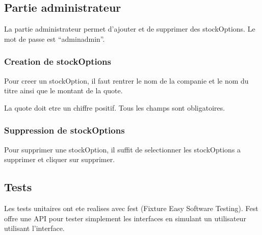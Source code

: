 \subsection{Partie administrateur}
La partie administrateur permet d'ajouter et de supprimer des stockOptions. Le mot de passe est ``adminadmin''.
\subsubsection{Creation de stockOptions}
Pour creer un stockOption, il faut rentrer le nom de la companie et le nom du titre ainsi que le montant de la quote.

La quote doit etre un chiffre positif. Tous les champs sont obligatoires.
\subsubsection{Suppression de stockOptions}
Pour supprimer une stockOption, il suffit de selectionner les stockOptions a supprimer et cliquer sur supprimer.
\subsection{Tests}
Les tests unitaires ont ete realises avec fest (Fixture Easy Software Testing). Fest offre une API pour tester simplement les interfaces en simulant un utilisateur utilisant l'interface.
